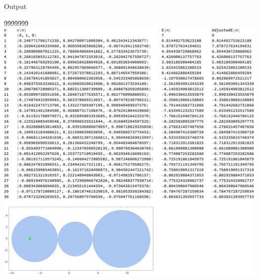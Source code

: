 \documentclass[12pt,twoside,openany]{memoir}
\begin{document}
\begin{solution}
\newpage
\begin{mmaCell}{Output}
 
\end{mmaCell}
\h9\h9\h9\h9\h9\h9\h9\includegraphics[scale=0.5]{problem52}

    \end{solution}
    
\end{document}
